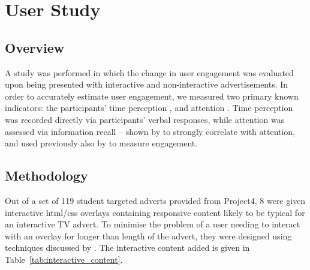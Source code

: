 \section{User Study}
	\label{sec:user_study}
	\subsection{Overview}
	A study was performed in which the change in user engagement was evaluated upon being presented with interactive and non-interactive advertisements. In order to accurately estimate user engagement, we measured two primary known indicators: the participants' time perception \citep{time_perception}, and attention \cite{what_is_engagement}. Time perception was recorded directly via participants' verbal responses, while attention was assessed via information recall -- shown by \citet{interactions_attention_memory} to strongly correlate with attention, and used previously also by \citet{advertising_engagement} to measure engagement.

	\subsection{Methodology}
	Out of a set of 119 student targeted adverts provided from Project4, 8 were given interactive html/css overlays containing responsive content likely to be typical for an interactive TV advert. To minimise the problem of a user needing to interact with an overlay for longer than length of the advert, they were designed using techniques discussed by \citet{integrated-approach-advertising}. The interactive content added is given in Table~\ref{tab:interactive_content}.


